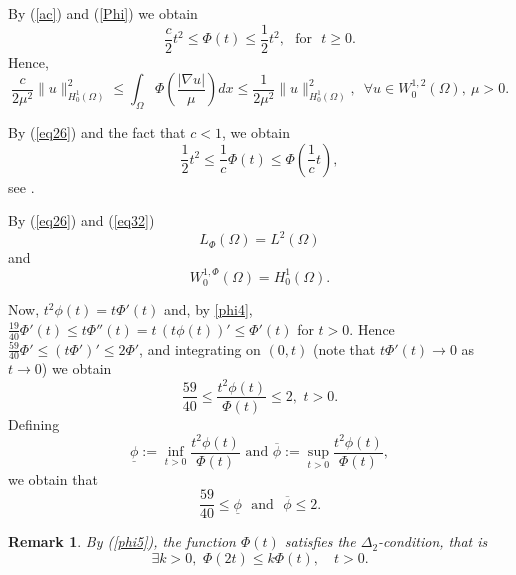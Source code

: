 \documentclass[11pt,leqno]{amsart}
\newtheorem{remark}[theorem]{Remark}
\begin{document}
	
\noindent	By (\ref{ac}) and (\ref{Phi}) we obtain 
	\begin{equation}\label{eq26}
		\frac{c}{2}t^2\leq \Phi(t)\leq \frac{1}{2}t^2, \,\, \mbox{ for } \,\, t\geq 0.
	\end{equation}
	Hence,
	\begin{equation}\label{eq32}
		\frac{c}{2\mu^2}\|u\|_{H_0^1(\Omega)}^2\leq \int_{\Omega}\Phi\left(\frac{|\nabla u|}{\mu}\right)dx \leq \frac{1}{2\mu^2}\|u\|_{H_0^1(\Omega)}^2, \,\,\, \forall u \in  W^{1,2}_0(\Omega),\ \mu>0.
	\end{equation}
	
\noindent	By (\ref{eq26}) and the fact that $c<1$, we obtain
	\begin{equation}\label{eq30}
		\frac{1}{2}t^2\leq \frac{1}{c}\Phi(t) \leq \Phi\left(\frac{1}{c}t\right),
	\end{equation}
	see \cite[Lemma 3.2.2]{KOF}. 
	
\noindent	By (\ref{eq26}) and (\ref{eq32})
	\[
	L_{\Phi}(\Omega)=L^2(\Omega)
	\]
and
	\begin{equation}\label{eq31}
		W_{0}^{1, \Phi}(\Omega)=H^1_0(\Omega).
	\end{equation}


Now, $t^2\phi(t)=t\Phi'(t)$ and, by \eqref{phi4},
$\frac{19}{40}\Phi'(t)\le t\Phi''(t)=t\,(t\phi(t))'\le\Phi'(t)$ for $t>0$.
Hence $\frac{59}{40}\Phi'\le (t\Phi')'\le2\Phi'$, and integrating on
$(0,t)$ (note that $t\Phi'(t)\to0$ as $t\to0$) we obtain
\begin{equation}\label{phi5}
		\frac{59}{40}\leq \frac{t^2\phi(t)}{\Phi(t)} \leq 2, \,\, t>0.
\end{equation}
Defining
\begin{equation}\label{infphi}
	\underline{\phi}:=\inf _{t>0} \frac{t^2\phi(t)}{\Phi(t)} \mbox{ and } \overline{\phi}:=\sup _{t>0} \frac{t^2 \phi(t)}{\Phi(t)},
\end{equation}
we obtain that
\begin{equation}\label{underoverphi}
	\frac{59}{40}\leq \underline{\phi} \,\,\mbox{ and } \,\, \overline{\phi}\leq 2.
\end{equation}


\begin{remark}\label{rema2}
	By (\ref{phi5}), the function $\Phi(t)$ satisfies the $\Delta_{2}$-condition, that is
	$$
	\exists k>0,\,\,	\Phi(2 t) \leq k \Phi(t), \quad t>0.
	$$
\end{remark}
\end{document}
